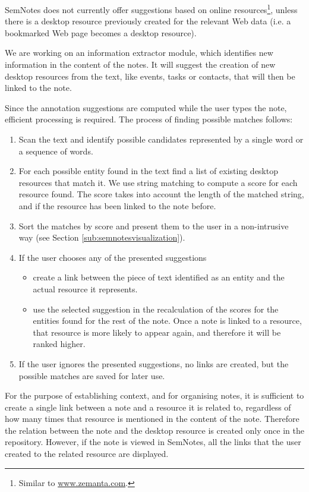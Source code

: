 SemNotes does not currently offer suggestions based on online resources\footnote{Similar to \url{www.zemanta.com}.}, unless there is a desktop resource previously created for the relevant Web data (i.e. a bookmarked Web page becomes a desktop resource). 

We are working on an information extractor module, which identifies new information in the content of the notes. It will suggest the creation of new desktop resources from the text, like events, tasks or contacts, that will then be linked to the note. 

Since the annotation suggestions are computed while the user types the note, efficient processing is required. The process of finding possible matches follows:
\begin{enumerate}
 \item Scan the text and identify possible candidates represented by a single word or a sequence of words.
 \item For each possible entity found in the text find a list of existing desktop resources that match it. We use string matching to compute a score for each resource found. The score takes into account the length of the matched string, and if the resource has been linked to the note before.
 \item Sort the matches by score and present them to the user in a non-intrusive way (see Section \ref{sub:semnotesvisualization}).
 \item If the user chooses any of the presented suggestions 
  \begin{itemize}
   \item create a link between the piece of text identified as an entity and the actual resource it represents.
   \item use the selected suggestion in the recalculation of the scores for the entities found for the rest of the note. Once a note is linked to a resource, that resource is more likely to appear again, and therefore it will be ranked higher.
  \end{itemize}
 \item If the user ignores the presented suggestions, no links are created, but the possible matches are saved for later use.  
\end{enumerate}

For the purpose of establishing context, and for organising notes, it is sufficient to create a single link between a note and a resource it is related to, regardless of how many times that resource is mentioned in the content of the note. Therefore the relation between the note and the desktop resource is created only once in the repository. However, if the note is viewed in SemNotes, all the links that the user created to the related resource are displayed.

